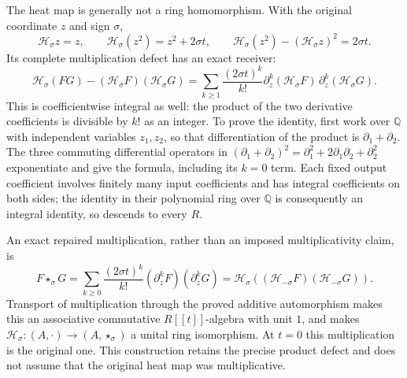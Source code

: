 \documentclass[11pt]{article}
\newcommand{\Q}{\mathbb Q}
\newcommand{\Ht}{\mathcal H}
\begin{document}
The heat map is generally not a ring homomorphism. With the
original coordinate $z$ and sign $\sigma$,
\begin{equation}\tag{SH19}\label{sh:productdefectexample}
 \Ht_\sigma z=z,\qquad
 \Ht_\sigma(z^2)=z^2+2\sigma t,\qquad
 \Ht_\sigma(z^2)-(\Ht_\sigma z)^2=2\sigma t.
\end{equation}
Its complete multiplication defect has an exact receiver:
\begin{equation}\tag{SH20}\label{sh:productdefect}
 \Ht_\sigma(FG)-(\Ht_\sigma F)(\Ht_\sigma G)
 =\sum_{k\ge1}\frac{(2\sigma t)^k}{k!}
       \partial_z^k(\Ht_\sigma F)\,
       \partial_z^k(\Ht_\sigma G).
\end{equation}
This is coefficientwise integral as well: the product of the two
derivative coefficients is divisible by $k!$ as an integer.
To prove the identity, first work over $\Q$ with independent
variables $z_1,z_2$, so that differentiation of the product is
$\partial_1+\partial_2$. The three commuting differential
operators in
$(\partial_1+\partial_2)^2=\partial_1^2+
2\partial_1\partial_2+\partial_2^2$ exponentiate and give the
formula, including its $k=0$ term. Each fixed output coefficient
involves finitely many input coefficients and has integral
coefficients on both sides; the identity in their polynomial
ring over $\Q$ is consequently an integral identity, so descends
to every $R$.

An exact repaired multiplication, rather than an imposed
multiplicativity claim, is
\begin{equation}\tag{SH21}\label{sh:star}
 F\star_\sigma G
 =\sum_{k\ge0}\frac{(2\sigma t)^k}{k!}
                       (\partial_z^kF)(\partial_z^kG)
 =\Ht_\sigma((\Ht_{-\sigma}F)(\Ht_{-\sigma}G)).
\end{equation}
Transport of multiplication through the proved additive
automorphism makes this an associative commutative
$R[[t]]$-algebra with unit $1$, and makes
$\Ht_\sigma:(A,\cdot)\to(A,\star_\sigma)$ a unital
ring isomorphism. At $t=0$ this multiplication is the original
one. This construction retains the precise product defect and
does not assume that the original heat map was multiplicative.
\end{document}
